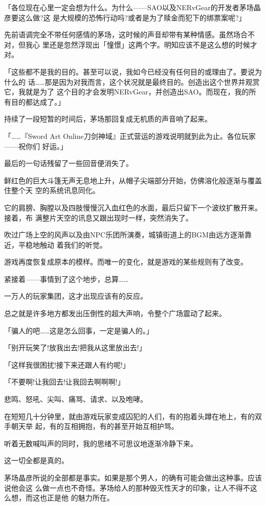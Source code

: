\documentclass[11pt]{book}
\begin{document}
「各位现在心里一定会想为什么。为什么——SAO以及NERvGear的开发者茅场晶彦要这么做?这
是大规模的恐怖行动吗?或者是为了赎金而犯下的绑票案呢?」

先前语调完全不带任何感情的茅场，这时候的声音却带有某种情感。虽然场合不对，但我心
里还是忽然浮现出「憧憬」这两个字。明知应该不是这么想的时候才对。

「这些都不是我的目的。甚至可以说，我如今已经没有任何目的或理由了。要说为什么的
话……那是因为对我而言，这个状况就是最终目的。创造出这个世界并观赏它，我就是为了
这个目的才会发明NERvGear，并创造出SAO。而现在，我的所有目的都达成了。」

持续了一段短暂的时间后，茅场那回复成无机质的声音响了起来。

「……『Sword Art Online刀剑神域』正式营运的游戏说明就到此为止。各位玩家——祝你们
好运。」

最后的一句话残留了一些回音便消失了。

鲜红色的巨大斗篷无声无息地上升，从帽子尖端部分开始，仿佛溶化般逐渐与覆盖住整个天
空的系统讯息同化。

它的肩膀、胸膛以及四肢慢慢沉入血红色的水面，最后只留下一个波纹扩散开来。接着，布
满整片天空的讯息又跟出现时一样，突然消失了。

吹过广场上空的风声以及由NPC乐团所演奏，城镇街道上的BGM由远方逐渐靠近，平稳地触动
着我们的听觉。

游戏再度恢复成原本的模样。而唯一的变化，就是游戏的某些规则有了改变。

紧接着——事情到了这个地步，总算……

一万人的玩家集团，这才出现应该有的反应。

总之就是许多地方都发出压倒性的超大声响，令整个广场震动了起来。

「骗人的吧……这是怎么回事，一定是骗人的。」

「别开玩笑了!放我出去!把我从这里放出去!」

「这样我很困扰!接下来还跟人有约呢!」

「不要啊!让我回去!让我回去啊啊啊!」

悲鸣、怒吼、尖叫、痛骂、请求、以及咆哮。

在短短几十分钟里，就由游戏玩家变成囚犯的人们，有的抱着头蹲在地上，有的双手朝天举
起，有的互相拥抱，有的甚至开始互相护骂。

听着无数喊叫声的同时，我的思绪不可思议地逐渐冷静下来。

这一切全都是真的。

茅场晶彦所说的全部都是事实。如果是那个男人，的确有可能会做出这种事。应该说他会这
么做一点也不奇怪。茅场给人的那种毁灭性天才的印象，让人不得不这么想，而这也正是他
的魅力所在。
\end{document}
